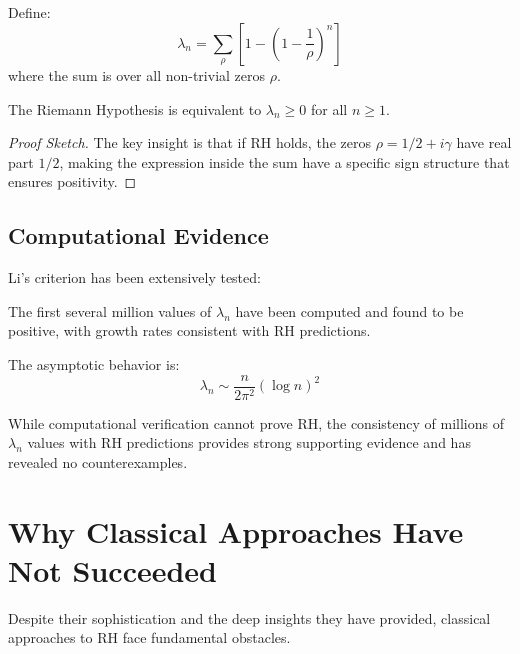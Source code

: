 \begin{definition}
Define:
\begin{equation}
\lambda_n = \sum_{\rho} \left[1 - \left(1 - \frac{1}{\rho}\right)^n\right]
\end{equation}
where the sum is over all non-trivial zeros $\rho$.
\end{definition}

\begin{theorem}
The Riemann Hypothesis is equivalent to $\lambda_n \geq 0$ for all $n \geq 1$.
\end{theorem}

\begin{proof}[Proof Sketch]
The key insight is that if RH holds, the zeros $\rho = 1/2 + i\gamma$ have real part $1/2$, making the expression inside the sum have a specific sign structure that ensures positivity.
\end{proof}

\subsection{Computational Evidence}

Li's criterion has been extensively tested:

\begin{theorem}
The first several million values of $\lambda_n$ have been computed and found to be positive, with growth rates consistent with RH predictions.
\end{theorem}

The asymptotic behavior is:
\begin{equation}
\lambda_n \sim \frac{n}{2\pi^2} (\log n)^2
\end{equation}

\begin{remark}
While computational verification cannot prove RH, the consistency of millions of $\lambda_n$ values with RH predictions provides strong supporting evidence and has revealed no counterexamples.
\end{remark}

\section{Why Classical Approaches Have Not Succeeded}

Despite their sophistication and the deep insights they have provided, classical approaches to RH face fundamental obstacles.

